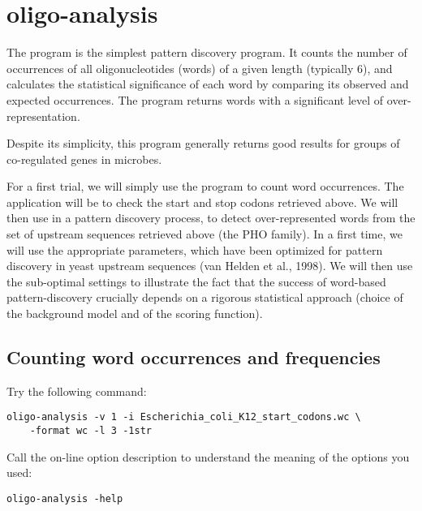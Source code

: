\section{oligo-analysis}

The program  is the simplest pattern discovery
program. It counts the number of occurrences of all oligonucleotides
(words) of a given length (typically 6), and calculates the
statistical significance of each word by comparing its observed and
expected occurrences. The program returns words with a significant
level of over-representation.

Despite its simplicity, this program generally returns good results
for groups of co-regulated genes in microbes.

For a first trial, we will simply use the program to count word
occurrences. The application will be to check the start and stop
codons retrieved above. We will then use  in a
pattern discovery process, to detect over-represented words from the
set of upstream sequences retrieved above (the PHO family).  In a
first time, we will use the appropriate parameters, which have been
optimized for pattern discovery in yeast upstream sequences (van
Helden et al., 1998). We will then use the sub-optimal settings to
illustrate the fact that the success of word-based pattern-discovery
crucially depends on a rigorous statistical approach (choice of the
background model and of the scoring function).

\subsection{Counting word occurrences and frequencies}

Try the following command:

{\color{Blue} \begin{footnotesize} 
\begin{verbatim}
oligo-analysis -v 1 -i Escherichia_coli_K12_start_codons.wc \
    -format wc -l 3 -1str
\end{verbatim} \end{footnotesize}
}

Call the on-line option description to understand the meaning of the
options you used:

{\color{Blue} \begin{footnotesize} 
\begin{verbatim}
oligo-analysis -help
\end{verbatim} \end{footnotesize}
}


